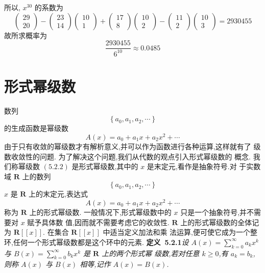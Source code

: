 \documentclass{report}
\begin{document}
所以, $x^{30}$ 的系数为
$$
\left(\begin{array}{c}
29 \\ 20
\end{array}\right)-\left(\begin{array}{c}
23 \\ 14
\end{array}\right)\left(\begin{array}{c}
10 \\ 1
\end{array}\right)+\left(\begin{array}{c}
17 \\ 8
\end{array}\right)\left(\begin{array}{c}
10 \\ 2
\end{array}\right)-\left(\begin{array}{c}
11 \\ 2
\end{array}\right)\left(\begin{array}{c}
10 \\ 3
\end{array}\right)=2930455
$$
故所求概率为
$$
\frac{2930455}{6^{10}} \approx 0.0485
$$

\section{形式幂级数}
数列
$$
\left\{a_{0}, a_{1}, a_{2}, \cdots\right\}
$$
的生成函数是幂级数
$$
A(x)=a_{0}+a_{1} x+a_{2} x^{2}+\cdots
$$
由于只有收敛的幂级数才有解析意义,并可以作为函数进行各种运算,这样就有了 级数收敛性的问题. 为了解决这个问题,我们从代数的观点引入形式幂级数的 概念.
我们称幂级数 $(5.2 .2)$ 是形式幂级数,其中的 $x$ 是末定元,看作是抽象符号.对 于实数域 $\mathbf{R}$ 上的数列
$$
\left\{a_{0}, a_{1}, a_{2}, \cdots\right\}
$$
$x$ 是 $\mathbf{R}$ 上的末定元,表达式
$$
A(x)=a_{0}+a_{1} x+a_{2} x^{2}+\cdots
$$
称为 $\mathbf{R}$ 上的形式幂级数.
一般情况下,形式幂级数中的 $x$ 只是一个抽象符号,并不需要对 $x$ 赋予具体数 值,因而就不需要考虑它的收敛性.
$\mathbf{R}$ 上的形式幂级数的全体记为 $\mathbf{R}[[x]] .$ 在集合 $\mathbf{R}[[x]]$ 中适当定义加法和乘 法运算,便可使它成为一个整环,任何一个形式幂级数都是这个环中的元素.
\noindent
\textbf{定义\ 5.2.1}\textsl {设 $A(x)=\sum_{k=0}^{\infty} a_{k} x^{k}$ 与 $B(x)=\sum_{k=0}^{\infty} b_{k} x^{k}$ 是 $\mathbf{R}$ 上的两个形式幂 级数,若对任意 $k \geqslant 0$,有 $a_{k}=b_{k}$, 则称 $A(x)$ 与 $B(x)$ 相等,记作 $A(x)=B(x)$.}
\end{document}
